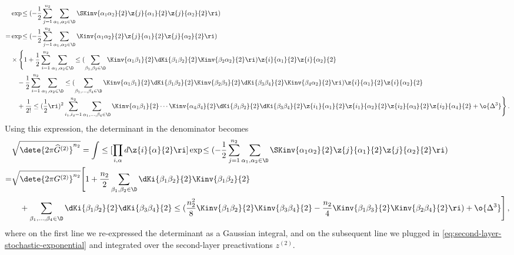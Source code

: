 \begin{align}\label{eq:second-layer-stochastic-exponential}
&\exp\!\le(-\frac{1}{2}\sum_{j=1}^{n_2}\sum_{\alpha_1,\alpha_2\in\D}\SKinv{\alpha_1 \alpha_2}{2}\z{j}{\alpha_1}{2}\z{j}{\alpha_2}{2}\ri)\, \\
=&\exp\!\le(-\frac{1}{2}\sum_{j=1}^{n_2}\sum_{\alpha_1,\alpha_2\in\D}\Kinv{\alpha_1 \alpha_2}{2}\z{j}{\alpha_1}{2}\z{j}{\alpha_2}{2}\ri)\, \nonumber\\
&\times\Bigg\{ 1+\frac{1}{2}\sum_{i=1}^{n_2}\sum_{\alpha_1,\alpha_{2}\in\D} \le(\sum_{\beta_1,\beta_{2}\in\D}\Kinv{\alpha_1\beta_1}{2}\dKi{\beta_1\beta_2}{2}\Kinv{\beta_2\alpha_2}{2}\ri)\z{i}{\alpha_1}{2}\z{i}{\alpha_2}{2}\, \nonumber\\
&\quad -\frac{1}{2}\sum_{i=1}^{n_2}\sum_{\alpha_1,\alpha_{2}\in\D} \le(\sum_{\beta_1,\ldots,\beta_{4}\in\D}\Kinv{\alpha_1\beta_1}{2}\dKi{\beta_1\beta_2}{2}\Kinv{\beta_2\beta_3}{2} \dKi{\beta_{3}\beta_{4}}{2} \Kinv{\beta_{4}\alpha_2}{2}\ri)\z{i}{\alpha_1}{2}\z{i}{\alpha_2}{2}\, \nonumber\\
&\quad + \frac{1}{2!}\le(\frac{1}{2}\ri)^2\sum_{i_1,i_2=1}^{n_2}\sum_{\alpha_1,\ldots,\beta_{4}\in\D}\Kinv{\alpha_1\beta_1}{2}\cdots\Kinv{\alpha_4\beta_4}{2} \dKi{\beta_1\beta_2}{2} \dKi{\beta_3\beta_4}{2} \z{i_1}{\alpha_1}{2}\z{i_1}{\alpha_2}{2}\z{i_2}{\alpha_{3}}{2}\z{i_2}{\alpha_{4}}{2}+\o{\Delta^3}\Bigg\}\, .\nonumber
\end{align}
Using this expression, the determinant in the denominator becomes
\begin{align}\label{eq:second-layer-stochastic-determinant}
&\sqrt{\dete{2\pi \widehat{G}^{(2)}}^{n_2}}=\int \le[\prod_{i,\alpha}  d\z{i}{\alpha}{2}\ri]\exp\!\le(-\frac{1}{2}\sum_{j=1}^{n_2}\sum_{\alpha_1,\alpha_2\in\D}\SKinv{\alpha_1 \alpha_2}{2}\z{j}{\alpha_1}{2}\z{j}{\alpha_2}{2}\ri)\, \\
=&\sqrt{\dete{2\pi G^{(2)}}^{n_2}}\Bigg[1+\frac{n_2}{2}\sum_{\beta_1,\beta_2\in\D}\dKi{\beta_1\beta_2}{2}\Kinv{\beta_1\beta_2}{2}\, \nonumber\\
&\quad+\sum_{\beta_1,\ldots,\beta_4\in\D}\dKi{\beta_1\beta_2}{2}\dKi{\beta_3\beta_4}{2}\le(\frac{n_2^2}{8}\Kinv{\beta_1\beta_2}{2}\Kinv{\beta_3\beta_4}{2}-\frac{n_2}{4}\Kinv{\beta_1\beta_3}{2}\Kinv{\beta_2\beta_4}{2}\ri)+\o{\Delta^3}\Bigg]\, ,\nonumber
\end{align}
where on the first line we re-expressed the determinant as a Gaussian integral, and on the subsequent line we plugged in \eqref{eq:second-layer-stochastic-exponential} and integrated over the second-layer preactivations $z^{(2)}$.

